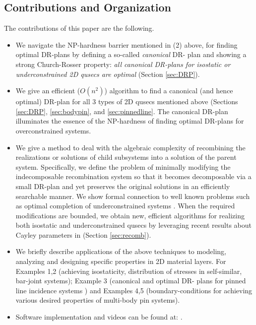 \subsection{Contributions and Organization}
\label{sec:cont}

The contributions of this paper are the following.
\begin{itemize}
\item
We navigate the NP-hardness barrier mentioned in (2) above, for
finding optimal DR-plans by defining a so-called {\it canonical} DR-
plan and showing a strong Church-Rosser property: {\it all canonical
DR-plans for isostatic or underconstrained 2D qusecs are optimal}
(Section \ref{sec:DRP}).

\item
We give an efficient ($O(n^2)$) algorithm to find a canonical (and
hence optimal) DR-plan for all 3 types of 2D qusecs mentioned above
(Sections \ref{sec:DRP}, \ref{sec:bodypin}, and \ref{sec:pinnedline}.
The canonical DR-plan illuminates the essence of the NP-hardness of
finding optimal DR-plans for overconstrained systems.

\item
We give a method to deal with the algebraic complexity of recombining
the realizations or solutions of  child subsystems into a solution of
the parent system. Specifically, we define the problem of  minimally
modifying the indecomposable recombination system so that it becomes
decomposable via a small DR-plan and yet preserves the original
solutions in an efficiently searchable manner. We show formal
connection to well known problems such as optimal completion of
underconstrained  systems  \cite{XX}.  When the required modifications
are bounded, we obtain new, efficient algorithms for realizing both
isostatic and underconstrained qusecs by leveraging recent results
about Cayley parameters in \cite{XX,XX}  (Section \ref{sec:recomb}).

\item
We briefly describe applications of the above techniques to modeling,
analyzing and designing specific properties in 2D material layers. For
Examples 1,2 (achieving isostaticity, distribution of stresses in
self-similar, bar-joint systems); Example 3 (canonical and optimal DR-
plans for pinned line incidence systems \cite{XX}) and Examples 4,5
(boundary-conditions for achieving various desired properties of
multi-body  pin systems).

\item
Software implementation and videos can be found at: .
\end{itemize}
